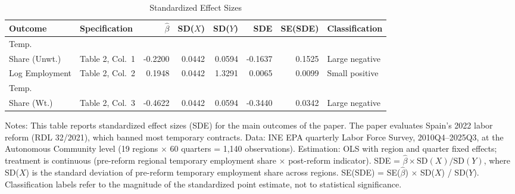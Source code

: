 \begin{table}[H]
\centering
\caption{Standardized Effect Sizes}
\begin{threeparttable}
\footnotesize
\begin{tabular}{llrrrrrl}
\toprule
Outcome & Specification & $\hat{\beta}$ & SD($X$) & SD($Y$) & SDE & SE(SDE) & Classification \\
\midrule
Temp.\\ Share (Unwt.) & Table 2, Col.\ 1 & -0.2200 & 0.0442 & 0.0594 & -0.1637 & 0.1525 & Large negative \\
Log Employment & Table 2, Col.\ 2 & 0.1948 & 0.0442 & 1.3291 & 0.0065 & 0.0099 & Small positive \\
Temp.\\ Share (Wt.) & Table 2, Col.\ 3 & -0.4622 & 0.0442 & 0.0594 & -0.3440 & 0.0342 & Large negative \\
\bottomrule
\end{tabular}
\begin{tablenotes}[flushleft]
\small
\item Notes: This table reports standardized effect sizes (SDE) for the main outcomes of the paper. The paper evaluates Spain's 2022 labor reform (RDL 32/2021), which banned most temporary contracts. Data: INE EPA quarterly Labor Force Survey, 2010Q4--2025Q3, at the Autonomous Community level (19 regions $\times$ 60 quarters = 1,140 observations). Estimation: OLS with region and quarter fixed effects; treatment is continuous (pre-reform regional temporary employment share $\times$ post-reform indicator). SDE = $\hat{\beta} \times \text{SD}(X) / \text{SD}(Y)$, where SD($X$) is the standard deviation of pre-reform temporary employment share across regions. SE(SDE) = SE($\hat{\beta}$) $\times$ SD($X$) / SD($Y$). Classification labels refer to the magnitude of the standardized point estimate, not to statistical significance.
\end{tablenotes}
\end{threeparttable}
\label{tab:sde}
\end{table}

